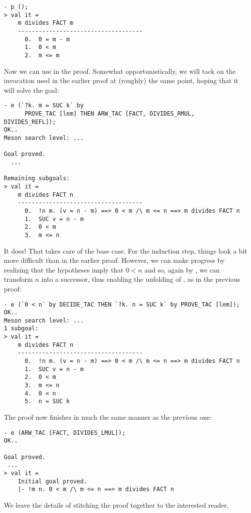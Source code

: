 \begin{session}\begin{verbatim}
- p ();
> val it =
    m divides FACT m
    ------------------------------------
      0.  0 = m - m
      1.  0 < m
      2.  m <= m
\end{verbatim}\end{session}
    Now we can use  in the proof. Somewhat opportunistically,
    we will tack on the invocation used in the earlier proof at
    (roughly) the same point, hoping that it will solve the goal:
\begin{session}\begin{verbatim}
- e (`?k. m = SUC k` by
      PROVE_TAC [lem] THEN ARW_TAC [FACT, DIVIDES_RMUL, DIVIDES_REFL]);
OK..
Meson search level: ...

Goal proved.
  ...

Remaining subgoals:
> val it =
    m divides FACT n
    ------------------------------------
      0.  !n m. (v = n - m) ==> 0 < m /\ m <= n ==> m divides FACT n
      1.  SUC v = n - m
      2.  0 < m
      3.  m <= n
\end{verbatim}\end{session}
    It does! That takes care of the base case. For the induction step,
    things look a bit more difficult than in the earlier proof.
    However, we can make progress by realizing that the hypotheses
    imply that $0 < n$ and so, again by , we can transform $n$
    into a successor, thus enabling the unfolding of , as in
    the previous proof:
\begin{session}\begin{verbatim}
- e (`0 < n` by DECIDE_TAC THEN `?k. n = SUC k` by PROVE_TAC [lem]);
OK..
Meson search level: ...
1 subgoal:
> val it =
    m divides FACT n
    ------------------------------------
      0.  !n m. (v = n - m) ==> 0 < m /\ m <= n ==> m divides FACT n
      1.  SUC v = n - m
      2.  0 < m
      3.  m <= n
      4.  0 < n
      5.  n = SUC k
\end{verbatim}\end{session}
\noindent The proof now finishes in much the same manner as the previous one:
\begin{session}\begin{verbatim}
- e (ARW_TAC [FACT, DIVIDES_LMUL]);
OK..

Goal proved.
 ...
> val it =
    Initial goal proved.
    |- !m n. 0 < m /\ m <= n ==> m divides FACT n
\end{verbatim}\end{session}
\noindent We leave the details of stitching the proof together to the interested
reader.

